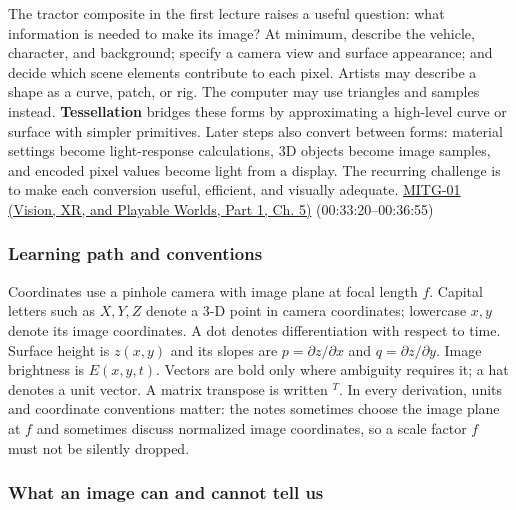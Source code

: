 The tractor composite in the first lecture raises a useful question: what information is needed to make its image? At minimum, describe the vehicle, character, and background; specify a camera view and surface appearance; and decide which scene elements contribute to each pixel. Artists may describe a shape as a curve, patch, or rig. The computer may use triangles and samples instead. \textbf{Tessellation} bridges these forms by approximating a high-level curve or surface with simpler primitives. Later steps also convert between forms: material settings become light-response calculations, 3D objects become image samples, and encoded pixel values become light from a display. The recurring challenge is to make each conversion useful, efficient, and visually adequate. \href{../07-Vision-XR-and-Playable-Worlds-P01/main.pdf\#nameddest=04-visual-computing-ii-ch036-mitg-01---introduction}{MITG-01 (Vision, XR, and Playable Worlds, Part 1, Ch. 5)} (00:33:20--00:36:55)

\subsubsection{Learning path and conventions}\label{03-visual-computing-i-ch001-learning-path-and-conventions}

\hypertarget{03-visual-computing-i-ch001-learning-path-and-conventions}{}

Coordinates use a pinhole camera with image plane at focal length \(f\). Capital letters such as \(X,Y,Z\) denote a 3-D point in camera coordinates; lowercase \(x,y\) denote its image coordinates. A dot denotes differentiation with respect to time. Surface height is \(z(x,y)\) and its slopes are \(p=\partial z/\partial x\) and \(q=\partial z/\partial y\). Image brightness is \(E(x,y,t)\). Vectors are bold only where ambiguity requires it; a hat denotes a unit vector. A matrix transpose is written \(^T\). In every derivation, units and coordinate conventions matter: the notes sometimes choose the image plane at \(f\) and sometimes discuss normalized image coordinates, so a scale factor \(f\) must not be silently dropped.

\subsubsection{What an image can and cannot tell us}\label{03-visual-computing-i-ch001-what-an-image-can-and-cannot-tell-us}

\hypertarget{03-visual-computing-i-ch001-what-an-image-can-and-cannot-tell-us}{}

